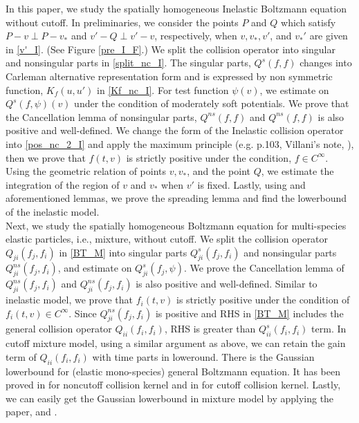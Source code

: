 \documentclass[reqno,10pt]{amsart}
\numberwithin{equation}{section}
\begin{document}
In this paper, we study the spatially homogeneous Inelastic Boltzmann equation without cutoff. In preliminaries, we consider the points $P$ and $Q$ which satisfy  $P-v\;\bot\;P-v_*$ and $v'-Q\;\bot\; v'-v$, respectively, when $v,v_*,v'$, and $v_*'$ are given in \eqref{v'_I}. (See Figure \ref{pre_I_F}.) We split the collision operator into singular and nonsingular parts in \eqref{split_nc_I}. The singular parts, $Q^{s}(f,f)$ changes into Carleman alternative representation form and is expressed by non symmetric function, $K_f(u,u')$ in \eqref{Kf_nc_I}. For test function $\psi(v)$, we estimate on $Q^{s}(f,\psi)(v)$  under the condition of moderately soft potentials. We prove that the Cancellation lemma of nonsingular parts, $Q^{ns}(f,f)$ and $Q^{ns}(f,f)$ is also positive and well-defined. We change the form of the Inelastic collision operator into \eqref{pos_nc_2_I} and apply the maximum principle (e.g. p.103, Villani's note, \cite{V2002}), then we prove that $f(t,v)$ is strictly positive under the condition, $f \in C^{\infty}$. Using the geometric relation of points $v,v_*$, and the point $Q$, we estimate the integration of the region of $v$ and $v_*$ when $v'$ is fixed. Lastly, using \cite{IM2020} and aforementioned lemmas, we prove the spreading lemma and find the lowerbound of the inelastic model. \\

Next, we study the spatially homogeneous Boltzmann equation for multi-species elastic particles, i.e., mixture, without cutoff. 
We split the collision operator $Q_{ji}(f_j,f_i)$ in \eqref{BT_M} into singular parts $Q^{s}_{ji}(f_j,f_i)$ and nonsingular parts $Q^{ns}_{ji}(f_j,f_i)$, and estimate on $Q^{s}_{ji}(f_j,\psi)$. We prove the Cancellation lemma of $Q^{ns}_{ji}(f_j,f_i)$ and $Q^{ns}_{ji}(f_j,f_i)$ is also positive and well-defined. Similar to inelastic model, we prove that $f_i(t,v)$ is strictly positive under the condition of $f_i(t,v) \in C^{\infty}.$ Since $Q^{ns}_{ji}(f_j,f_i)$ is positive and RHS in \eqref{BT_M} includes the general collision operator $Q_{ii}(f_i,f_i)$,
RHS is greater than $Q^{s}_{ii}(f_i,f_i)$ term. In cutoff mixture model, using a similar argument as above, we can retain the gain term of $Q_{ii}(f_i,f_i)$ with time parts in loweround. There is the Gaussian lowerbound for (elastic mono-species) general Boltzmann equation.
It has been proved in \cite{IM2020} for noncutoff collision kernel and in \cite{AB1996} for cutoff collision kernel. Lastly, we can easily get the Gaussian lowerbound in mixture model by applying the paper, \cite{IM2020} and \cite{AB1996}.  \\
\end{document}

